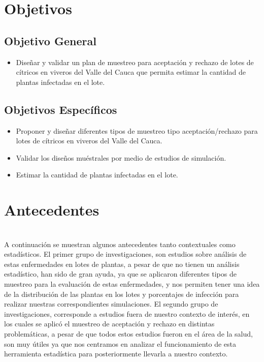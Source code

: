\section{Objetivos}
\subsection{Objetivo General}
\begin{itemize}
\item Dise\~{n}ar y validar un plan de muestreo para aceptaci\'{o}n y rechazo de lotes de c\'{i}tricos en viveros del Valle del Cauca que permita estimar la cantidad de plantas infectadas en el lote.
\end{itemize}
\subsection{Objetivos Espec\'{i}ficos}
\begin{itemize}
\item Proponer y dise\~{n}ar diferentes tipos de muestreo tipo aceptaci\'{o}n/rechazo para lotes de c\'{i}tricos en viveros del Valle del Cauca.
\item Validar los dise\~{n}os mu\'{e}strales por medio de estudios de simulaci\'{o}n.
\item Estimar la cantidad de plantas infectadas en el lote.
\end{itemize}
\section{Antecedentes}
~\\A continuaci\'{o}n se muestran algunos antecedentes tanto contextuales como estad\'{i}sticos. El primer grupo de investigaciones, son estudios sobre an\'{a}lisis de estas enfermedades en lotes de plantas, a pesar de que no tienen un an\'{a}lisis estad\'{i}stico, han sido de gran ayuda, ya que se aplicaron diferentes tipos de muestreo para la evaluaci\'{o}n de estas enfermedades, y nos permiten tener una idea de la distribuci\'{o}n de las plantas en los lotes y porcentajes de infecci\'{o}n para realizar nuestras correspondientes simulaciones. El segundo grupo de investigaciones, corresponde a estudios fuera de nuestro contexto de inter\'{e}s, en los cuales se aplic\'{o} el muestreo de aceptaci\'{o}n y rechazo en distintas problem\'{a}ticas, a pesar de que todos estos estudios fueron en el \'{a}rea de la salud, son muy \'{u}tiles ya que nos centramos en analizar el funcionamiento de esta herramienta estad\'{i}stica para posteriormente llevarla a nuestro contexto.

